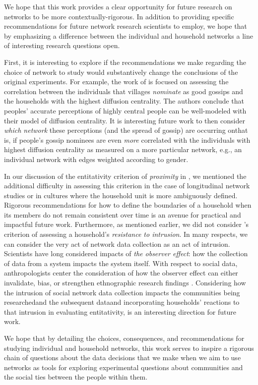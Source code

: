 We hope that this work provides a clear opportunity for future research on networks to be more contextually-rigorous. In addition to providing specific recommendations for future network research scientists to employ, we hope that by emphasizing a difference between the individual and household networks a line of interesting research questions open. 
 
First, it is interesting to explore if the recommendations we make regarding the choice of network to study would substantively change the conclusions of the original experiments. For example, the work of \cite{banerjee2019} is focused on assessing the correlation between the individuals that villages \textit{nominate} as good gossips and the households with the highest diffusion centrality. The authors conclude that peoples' accurate perceptions of highly central people can be well-modeled with their model of diffusion centrality. It is interesting future work to then consider \textit{which network} these perceptions (and the spread of gossip) are occurring on\textemdash that is, if people's gossip nominees are even \textit{more} correlated with the individuals with highest diffusion centrality as measured on a more particular network, e.g., an individual network with edges weighted according to gender. 

In our discussion of the entitativity criterion of \textit{proximity} in , we mentioned the additional difficulty in assessing this criterion in the case of longitudinal network studies or in cultures where the household unit is more ambiguously defined. Rigorous recommendations for how to define the boundaries of a household when its members do not remain consistent over time is an avenue for practical and impactful future work. Furthermore, as mentioned earlier, we did not consider \citeauthor{campbell1958common}'s criterion of assessing a household's \textit{resistance to intrusion}. In many respects, we can consider the very act of network data collection as an act of intrusion. Scientists have long considered impacts of \textit{the observer effect}: how the collection of data from a system impacts the system itself. With respect to social data, anthropologists center the consideration of how the observer effect can either invalidate, bias, or strengthen ethnographic research findings \citep{lecompte1982, monahan2010}. Considering how the intrusion of social network data collection impacts the communities being researched\textemdash and the subsequent data\textemdash and incorporating households' reactions to that intrusion in evaluating entitativity, is an interesting direction for future work. 

We hope that by detailing the choices, consequences, and recommendations for studying individual and household networks, this work serves to inspire a rigorous chain of questions about the data decisions that we make when we aim to use networks as tools for exploring experimental questions about communities and the social ties between the people within them.